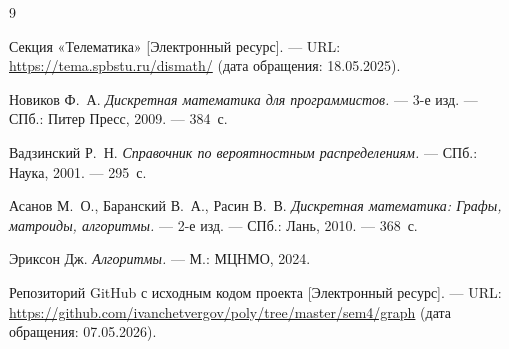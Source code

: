 \begin{thebibliography}{9}

Секция «Телематика» [Электронный ресурс]. ---
URL: \url{https://tema.spbstu.ru/dismath/} (дата обращения: 18.05.2025).

Новиков Ф.~А. \textit{Дискретная математика для программистов.} ---
3-е изд. --- СПб.: Питер Пресс, 2009. --- 384~с.

Вадзинский Р.~Н. \textit{Справочник по вероятностным распределениям.} ---
СПб.: Наука, 2001. --- 295~с.

Асанов М.~О., Баранский В.~А., Расин В.~В.
\textit{Дискретная математика: Графы, матроиды, алгоритмы.} ---
2-е изд. --- СПб.: Лань, 2010. --- 368~с.

Эриксон Дж. \textit{Алгоритмы.} --- М.: МЦНМО, 2024.

Репозиторий GitHub с исходным кодом проекта [Электронный ресурс]. ---
URL: \url{https://github.com/ivanchetvergov/poly/tree/master/sem4/graph}
(дата обращения: 07.05.2026).

\end{thebibliography}
